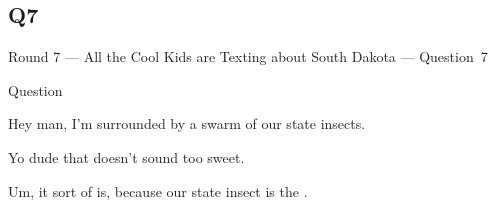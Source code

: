 \documentclass[11pt]{beamer}
\begin{document}
\subsection*{Q7}
\begin{frame}[t]{Round 7 --- All the Cool Kids are Texting about South Dakota --- \mbox{Question 7}}
\begin{block}{Question}

\begin{minipage}{0.9\textwidth}
\begin{mdframed}[
    roundcorner=7pt,
    backgroundcolor=black!5,
    linecolor=black!5,
    fontcolor=black,
    ignorelastdescenders]
\begin{flushleft}
{\small{}\selectfont{}
Hey man, I'm surrounded by a swarm of our state insects.
}
\end{flushleft}
\end{mdframed}
\end{minipage}

\hfill{}\begin{minipage}{0.9\textwidth}
\begin{mdframed}[
    roundcorner=7pt,
    backgroundcolor=blue!80!white,
    linecolor=blue!80!white,
    fontcolor=white,
    ignorelastdescenders]
\begin{flushleft}
{\small{}\selectfont{}
Yo dude that doesn't sound too sweet.
}
\end{flushleft}
\end{mdframed}
\end{minipage}

\begin{minipage}{0.9\textwidth}
\begin{mdframed}[
    roundcorner=7pt,
    backgroundcolor=black!5,
    linecolor=black!5,
    fontcolor=black,
    ignorelastdescenders]
\begin{flushleft}
{\small{}\selectfont{}
Um, it sort of is, because our state insect is the \textunderscore{}\textunderscore{}\textunderscore{}\textunderscore{}\textunderscore{}\textunderscore{} \textunderscore{}\textunderscore{}\textunderscore{}\textunderscore{}\textunderscore{}\textunderscore{}.
}
\end{flushleft}
\end{mdframed}
\end{minipage}
\end{block}
\end{frame}
\end{document}
